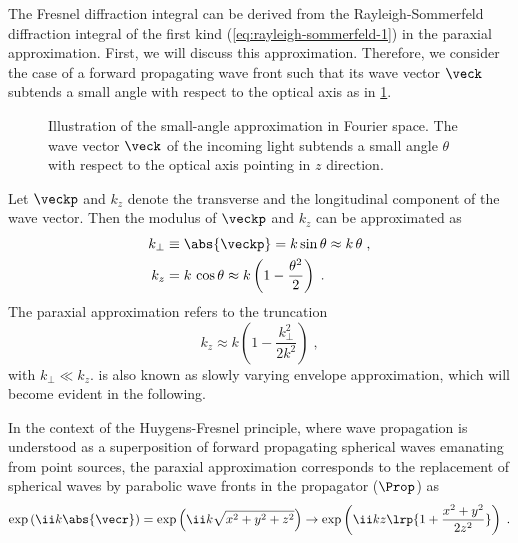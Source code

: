 \documentclass[
twoside,
openright,
titlepage,
numbers=noenddot,
headinclude,
fleqn,
a4paper,
footinclude=true,
cleardoublepage=empty,
abstractoff,
BCOR=5mm,
paper=a4,
fontsize=11pt,
british,ngerman,american,
]{scrreprt}
\begin{document}
The Fresnel diffraction integral can be derived from the
Rayleigh-Sommerfeld diffraction integral of the first kind
(\cref{eq:rayleigh-sommerfeld-1}) in the paraxial approximation.
First, we will discuss this approximation.  Therefore, we consider the
case of a forward propagating wave front such that its wave vector
$\veck$ subtends a small angle with respect to the optical axis as in
\cref{fig:small-angle-approximation}.
\begin{figure}
  \centering
  \caption[Small-angle approximation.]{Illustration of the small-angle
    approximation in Fourier space.  The wave vector $\veck$ of the
    incoming light subtends a small angle $\theta$ with respect to the
    optical axis pointing in $z$ direction.}
  \label{fig:small-angle-approximation}
\end{figure}
Let $\veckp$ and $k_z$ denote the transverse and the longitudinal
component of the wave vector.  Then the modulus of $\veckp$ and $k_z$
can be approximated as
\begin{equation}
  \label{eq:pa}
  \begin{split}
    k_\perp&\equiv\abs{\veckp}=k\sin\theta\approx k\, \theta \;, \\
    k_z&= k\,\cos\theta \approx k\left(1-\frac{\theta^2}{2}\right) \;.
  \end{split}
\end{equation}
The paraxial approximation refers to the truncation
\begin{equation}
\label{eq:pa-kz}
  k_z\approx k\left(1-\frac{k_\perp^2}{2k^2}\right) \;,
\end{equation}
with $k_\perp\ll k_z$.   is also known as slowly varying
envelope approximation, which will become evident in the following.

In the context of the Huygens-Fresnel principle, where wave
propagation is understood as a superposition of forward propagating
spherical waves emanating from point sources, the paraxial
approximation corresponds to the replacement of spherical waves by
parabolic wave fronts in the propagator ($\Prop$) as
\begin{equation}
  \label{eq:spherical-parabolic}
  \exp\left(\ii k \abs{\vecr}\right) =
  \exp\left(\ii k \sqrt{x^2+y^2+z^2}\right) \to
  \exp\left(\ii k z\lrp{1+\frac{x^2+y^2}{2z^2}}\right) \;. 
\end{equation}
\end{document}
